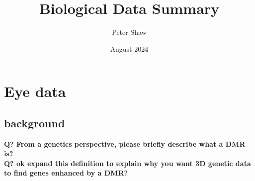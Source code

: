 \documentclass{article}
\title{Biological Data Summary}
\author{Peter Shaw}
\date{August 2024}
\begin{document}
\lstset{
    language=Python,
    basicstyle=\small\ttfamily,
    numbers=left,
    numbersep=5pt,
    frame=single,
    captionpos=b,
    breaklines=true,
    breakatwhitespace=false
}

\maketitle

\section{Eye data}
\subsection{background}

\textbf{
Q? From a genetics perspective, please briefly describe what a DMR is?\\
}
\textbf{
Q? ok expand this definition to explain why you want 3D genetic data to find genes enhanced by a DMR?\\
}
\end{document}
